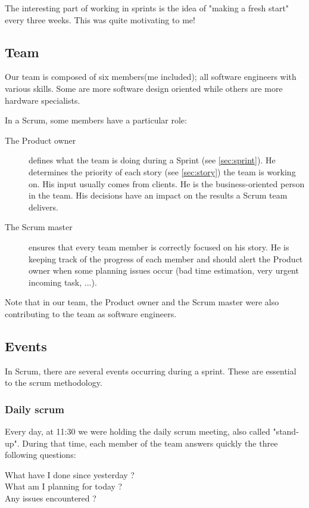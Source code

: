 The interesting part of working in sprints is the idea of "making a fresh start" every three weeks. This
was quite motivating to me!


\subsection{Team}
Our team is composed of six members(me included); all software engineers with various
skills. Some are more software design oriented while others are more hardware
specialists.

In a Scrum, some members have a particular role:
\begin{description}
    \item[The Product owner]
        defines what the team is doing during a Sprint (see \ref{sec:sprint}).
        He determines the priority of each story (see \ref{sec:story}) the team is working on. His input usually comes from
        clients. He is the business-oriented person in the team. His decisions have an impact on the results a Scrum team delivers.
    \item[The Scrum master]
        ensures that every team member is correctly focused on his story. He is keeping track of the progress of each member and
        should alert the Product owner when some planning issues occur (bad time estimation, very urgent incoming task, ...).
\end{description}

Note that in our team, the Product owner and the Scrum master were also contributing to the team as software engineers.

\subsection{Events}
In Scrum, there are several events occurring during a sprint.
These are essential to the scrum methodology.

\subsubsection{Daily scrum}
Every day, at 11:30 we were holding the daily scrum meeting, also called "stand-up".
During that time, each member of the team answers quickly the three following questions:

\begin{description}
    \item[What have I done since yesterday ?]
    \item[What am I planning for today ?]
    \item[Any issues encountered ?]
\end{description}

